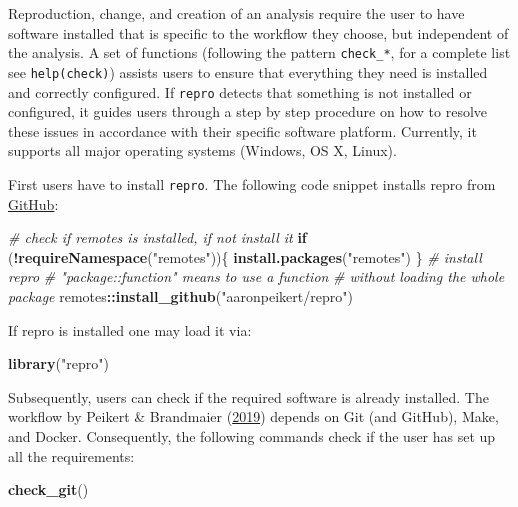 \documentclass[12pt,a4paper,twoside]{article}
\newenvironment{Shaded}{\begin{snugshade}}{\end{snugshade}}
\newcommand{\CommentTok}[1]{\textcolor[rgb]{0.56,0.35,0.01}{\textit{#1}}}
\newcommand{\ControlFlowTok}[1]{\textcolor[rgb]{0.13,0.29,0.53}{\textbf{#1}}}
\newcommand{\KeywordTok}[1]{\textcolor[rgb]{0.13,0.29,0.53}{\textbf{#1}}}
\newcommand{\NormalTok}[1]{#1}
\newcommand{\OperatorTok}[1]{\textcolor[rgb]{0.81,0.36,0.00}{\textbf{#1}}}
\newcommand{\StringTok}[1]{\textcolor[rgb]{0.31,0.60,0.02}{#1}}
\begin{document}
Reproduction, change, and creation of an analysis require the user to have software installed that is specific to the workflow they choose, but independent of the analysis.
A set of functions (following the pattern \texttt{check\_*}, for a complete list see \texttt{help(check)}) assists users to ensure that everything they need is installed and correctly configured.
If \texttt{repro} detects that something is not installed or configured, it guides users through a step by step procedure on how to resolve these issues in accordance with their specific software platform.
Currently, it supports all major operating systems (Windows, OS X, Linux).

First users have to install \texttt{repro}. The following code snippet installs repro from \href{https://github.com/aaronpeikert/repro}{GitHub}:

\begin{Shaded}
\begin{Highlighting}[]
\CommentTok{# check if remotes is installed, if not install it}
\ControlFlowTok{if}\NormalTok{ (}\OperatorTok{!}\KeywordTok{requireNamespace}\NormalTok{(}\StringTok{"remotes"}\NormalTok{))\{}
  \KeywordTok{install.packages}\NormalTok{(}\StringTok{"remotes"}\NormalTok{)}
\NormalTok{\}}
\CommentTok{# install repro}
\CommentTok{# "package::function" means to use a function}
\CommentTok{# without loading the whole package}
\NormalTok{remotes}\OperatorTok{::}\KeywordTok{install_github}\NormalTok{(}\StringTok{"aaronpeikert/repro"}\NormalTok{)}
\end{Highlighting}
\end{Shaded}

If repro is installed one may load it via:

\begin{Shaded}
\begin{Highlighting}[]
\KeywordTok{library}\NormalTok{(}\StringTok{"repro"}\NormalTok{)}
\end{Highlighting}
\end{Shaded}

Subsequently, users can check if the required software is already installed.
The workflow by Peikert \& Brandmaier (\protect\hyperlink{ref-peikertReproducibleDataAnalysis2019}{2019}) depends on Git (and GitHub), Make, and Docker.
Consequently, the following commands check if the user has set up all the requirements:

\begin{Shaded}
\begin{Highlighting}[]
\KeywordTok{check_git}\NormalTok{()}
\end{Highlighting}
\end{Shaded}
\end{document}
